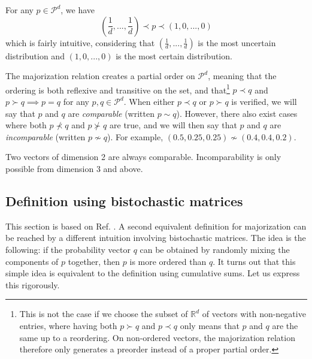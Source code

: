 \begin{remark}
    For any $p \in \mathcal{P}^d$, we have
    \begin{equation} \label{eq:top_bottom}
        \left(\frac{1}{d}, ..., \frac{1}{d}\right) \prec p \prec (1, 0, ..., 0)
    \end{equation}
    which is fairly intuitive, considering that $(\frac{1}{d}, ..., \frac{1}{d})$ is the most uncertain distribution and $(1, 0, ..., 0)$ is the most certain distribution. %
\end{remark}

The majorization relation creates a partial order on $\mathcal{P}^d$, meaning that the ordering is both reflexive and transitive on the set, and that\footnote{This is not the case if we choose the subset of $\mathbb{R}^d$  of vectors with non-negative entries, where having both $p \succ q$ and $p \prec q$ only means that $p$ and $q$ are the same up to a reordering. On non-ordered vectors, the majorization relation therefore only generates a preorder instead of a proper partial order.} $p \prec q$ and $p \succ q \implies p = q$ for any $p, q \in \mathcal{P}^d$. When either $p \prec q$ or $p \succ q$ is verified, we will say that $p$ and $q$ are \textit{comparable} (written $p \sim q$). However, there also exist cases where both $p \nprec q$ and $p \nsucc q$ are true, and we will then say that $p$ and $q$ are \textit{incomparable} (written $p \nsim q$). For example, $(0.5, 0.25, 0.25) \nsim (0.4, 0.4, 0.2)$.

\begin{remark}
    Two vectors of dimension 2 are always comparable. Incomparability is only possible from dimension 3 and above.
\end{remark}



\subsection{Definition using bistochastic matrices} \label{sec:bistochastic}

This section is based on Ref. \cite[pp. 29--33]{marshall_inequalities_2011}. A second equivalent definition for majorization can be reached by a different intuition involving bistochastic matrices. The idea is the following: if the probability vector $q$ can be obtained by randomly mixing the components of $p$ together, then $p$ is more ordered than $q$. It turns out that this simple idea is equivalent to the definition using cumulative sums. Let us express this rigorously.

